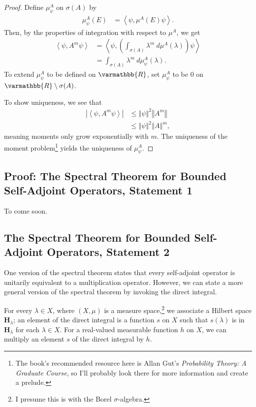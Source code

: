 \documentclass[12pt]{extarticle}
\newcommand{\R}{\varmathbb{R}}
\newcommand{\iprod}[2]{\left\langle #1,#2\right\rangle}
\newcommand{\norm}[1]{\left\Vert #1\right\Vert}
\theoremstyle{plain}
\theoremstyle{definition}
\theoremstyle{remark}
\renewcommand{\newline}{\hfill\break}
\begin{document}
  \begin{proof}
    Define $\mu^{A}_{\psi}$ on $\sigma(A)$ by
    \begin{align*}
      \mu^{A}_{\psi}(E) &= \iprod{\psi}{\mu^{A}(E)\psi}.
    \end{align*}
    Then, by the properties of integration with respect to $\mu^{A}$, we get
    \begin{align*}
      \iprod{\psi}{A^{m}\psi} &= \iprod{\psi}{\left(\int_{\sigma(A)}^{} \lambda^{m}\:d\mu^{A}(\lambda)\right)\psi}\\
                              &= \int_{\sigma(A)}^{} \lambda^{m}\:d\mu^{A}_{\psi}(\lambda).
    \end{align*}
    To extend $\mu^{A}_{\psi}$ to be defined on $\R$, set $\mu^{A}_{\psi}$ to be $0$ on $\R\setminus \sigma(A)$.\newline

    To show uniqueness, we see that
    \begin{align*}
      \left\vert \iprod{\psi}{A^{m}\psi} \right\vert &\leq \norm{\psi}^2\norm{A^{m}}\\
                                                     &\leq \norm{\psi}^2\norm{A}^{m},
    \end{align*}
    meaning moments only grow exponentially with $m$. The uniqueness of the moment problem\footnote{The book's recommended resource here is Allan Gut's \textit{Probability Theory: A Graduate Course}, so I'll probably look there for more information and create a prelude.} yields the uniqueness of $\mu^{A}_{\psi}$.
  \end{proof}
  \subsection{Proof: The Spectral Theorem for Bounded Self-Adjoint Operators, Statement 1}%
  To come soon.
  \subsection{The Spectral Theorem for Bounded Self-Adjoint Operators, Statement 2}%
  One version of the spectral theorem states that every self-adjoint operator is unitarily equivalent to a multiplication operator. However, we can state a more general version of the spectral theorem by invoking the direct integral.\newline

  For every $\lambda \in X$, where $(X,\mu)$ is a measure space,\footnote{I presume this is with the Borel $\sigma$-algebra.} we associate a Hilbert space $\mathbf{H}_{\lambda}$; an element of the direct integral is a function $s$ on $X$ such that $s(\lambda)$ is in $\mathbf{H}_{\lambda}$ for each $\lambda \in X$. For a real-valued measurable function $h$ on $X$, we can multiply an element $s$ of the direct integral by $h$.\newline
\end{document}
